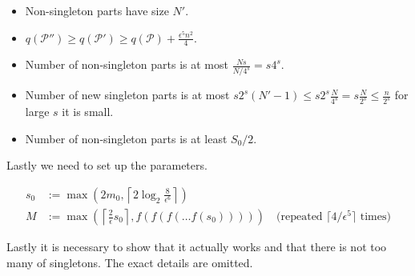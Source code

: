\begin{itemize}
	\item Non-singleton parts have size $N'$.
	\item $q(\mathcal{P}'') \geq q(\mathcal{P}') \geq q(\mathcal{P}) + \frac{\epsilon^5 n^2}{4}$.
	\item Number of non-singleton parts is at most $\frac{Ns}{N/4^s} = s4^s$.
	\item Number of new singleton parts is at most $s2^s(N' - 1) \leq s2^s \frac{N}{4^s} = s \frac{N}{2^s} \leq \frac{n}{2^s}$ for large $s$ it is small.
	\item Number of non-singleton parts is at least $S_0 / 2$.
\end{itemize}

Lastly we need to set up the parameters.

$$
\begin{aligned}
	s_0 &:= \max (2m_0, \left\lceil 2\log_2 \frac{8}{\epsilon^6} \right\rceil)\\
	M &:= \max( \left\lceil \frac{2}{\epsilon} s_0 \right\rceil, f(f(f(\dots f(s_0))))) \quad \text{(repeated } \lceil 4/\epsilon^5 \rceil \text{ times)}
\end{aligned}
$$

Lastly it is necessary to show that it actually works and that there is not too many of singletons. The exact details are omitted.